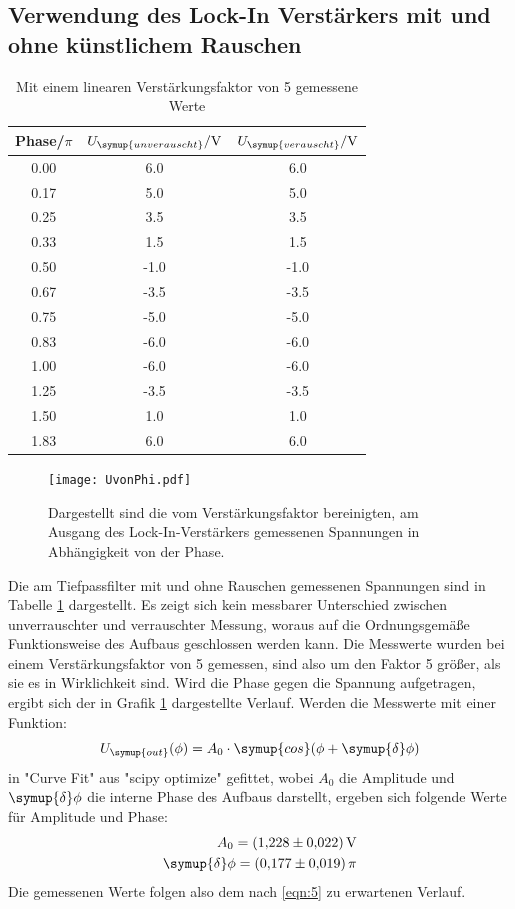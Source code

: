 \subsection{Verwendung des Lock-In Verstärkers mit und ohne künstlichem Rauschen}
\begin{table}
  \centering
  \caption{Mit einem linearen Verstärkungsfaktor von 5 gemessene Werte}
  \label{tab:1}
  \begin{tabular}{c c c}
    \toprule
    Phase/$\si{\pi}$ & $U_{\symup{unverauscht}}/\si{\volt}$ & $U_{\symup{verauscht}}/\si{\volt}$ \\
    \midrule
    0.00 & 6.0 & 6.0 \\
    0.17 & 5.0 & 5.0 \\
    0.25 & 3.5 & 3.5 \\
    0.33 & 1.5 & 1.5 \\
    0.50 & -1.0 & -1.0 \\
    0.67 & -3.5 & -3.5 \\
    0.75 & -5.0 & -5.0 \\
    0.83 & -6.0 & -6.0 \\
    1.00 & -6.0 & -6.0 \\
    1.25 & -3.5 & -3.5 \\
    1.50 & 1.0 & 1.0 \\
    1.83 & 6.0 & 6.0 \\
    \bottomrule
  \end{tabular}
\end{table}
\begin{figure}
  \centering
     \texttt{[image: UvonPhi.pdf]}
  \caption{Dargestellt sind die vom Verstärkungsfaktor bereinigten, am Ausgang des
  Lock-In-Verstärkers gemessenen Spannungen in Abhängigkeit von der Phase.}
  \label{plot:1}
\end{figure}
Die am Tiefpassfilter mit und ohne Rauschen gemessenen Spannungen sind in Tabelle \ref{tab:1}
dargestellt. Es zeigt sich kein messbarer Unterschied zwischen unverrauschter und verrauschter Messung,
woraus auf die Ordnungsgemäße Funktionsweise des Aufbaus geschlossen werden kann.
Die Messwerte wurden bei einem Verstärkungsfaktor von 5 gemessen, sind also um den Faktor 5
größer, als sie es in Wirklichkeit sind. Wird die Phase gegen die Spannung
aufgetragen, ergibt sich der in Grafik \ref{plot:1} dargestellte Verlauf. Werden die Messwerte mit einer
Funktion:
\begin{equation*}
  U_{\symup{out}}(\phi) = A_0 \cdot \symup{cos}(\phi + \symup{\delta}\phi)
\end{equation*}
in "Curve Fit" aus "scipy optimize" gefittet, wobei $A_0$ die Amplitude und $\symup{\delta}\phi$ die interne Phase des Aufbaus darstellt,
ergeben sich folgende Werte für Amplitude und Phase:
\begin{equation*}
  \begin{split}
    A_0 = \SI{1.228(22)}{\volt} \\
    \symup{\delta}\phi = \SI{0.177(19)}{\pi}
  \end{split}
\end{equation*}
Die gemessenen Werte folgen also dem nach \eqref{eqn:5} zu erwartenen Verlauf.
